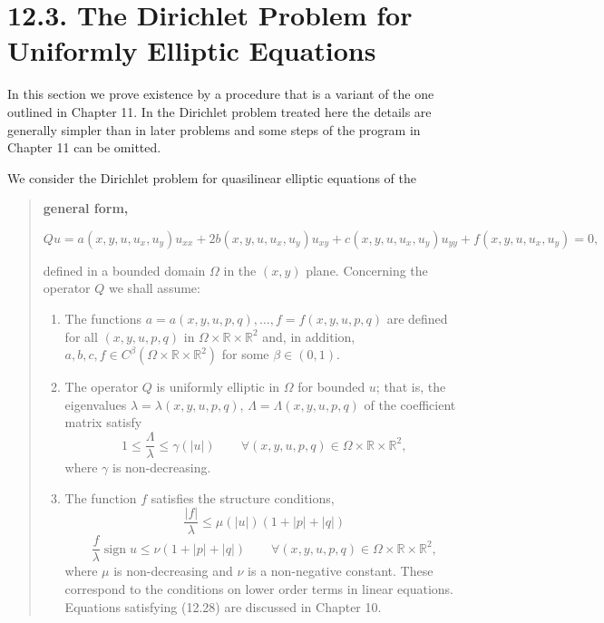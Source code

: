 \section*{12.3. The Dirichlet Problem for Uniformly Elliptic Equations}

In this section we prove existence by a procedure that is a variant of the one outlined in Chapter 11. In the Dirichlet problem treated here the details are generally simpler than in later problems and some steps of the program in Chapter 11 can be omitted.

We consider the Dirichlet problem for quasilinear elliptic equations of the



\begin{quote}
\textbf{general form,}

\begin{equation}\tag{12.25}
Qu = a(x,y,u,u_x,u_y)u_{xx} + 2b(x,y,u,u_x,u_y)u_{xy}
 + c(x,y,u,u_x,u_y)u_{yy} + f(x,y,u,u_x,u_y)=0,
\end{equation}

defined in a bounded domain $\Omega$ in the $(x,y)$ plane. Concerning the operator $Q$ we
shall assume:

\begin{enumerate}
\item[(i)] The functions $a=a(x,y,u,p,q), \dots, f=f(x,y,u,p,q)$ are defined for all
$(x,y,u,p,q)$ in $\Omega\times\mathbb{R}\times\mathbb{R}^2$ and, in addition, $a,b,c,f\in C^\beta(\Omega\times\mathbb{R}\times\mathbb{R}^2)$ for some
$\beta\in(0,1)$.

\item[(ii)] The operator $Q$ is uniformly elliptic in $\Omega$ for bounded $u$; that is, the
eigenvalues $\lambda=\lambda(x,y,u,p,q)$, $\Lambda=\Lambda(x,y,u,p,q)$ of the coefficient matrix satisfy
\begin{equation}\tag{12.26}
1\le \frac{\Lambda}{\lambda}\le \gamma(|u|)\qquad \forall (x,y,u,p,q)\in\Omega\times\mathbb{R}\times\mathbb{R}^2,
\end{equation}
where $\gamma$ is non-decreasing.

\item[(iii)] The function $f$ satisfies the structure conditions,
\begin{equation}\tag{12.27}
\frac{|f|}{\lambda}\le \mu(|u|)(1+|p|+|q|)
\end{equation}
\begin{equation}\tag{12.28}
\frac{f}{\lambda}\operatorname{sign}u\le \nu(1+|p|+|q|)\qquad \forall (x,y,u,p,q)\in\Omega\times\mathbb{R}\times\mathbb{R}^2,
\end{equation}
where $\mu$ is non-decreasing and $\nu$ is a non-negative constant. These correspond to
the conditions on lower order terms in linear equations. Equations satisfying
(12.28) are discussed in Chapter 10.
\end{enumerate}


\end{quote}
